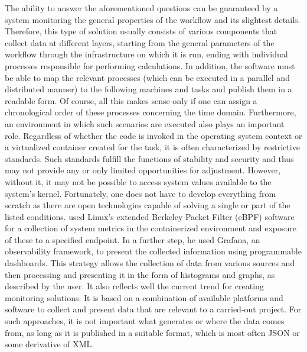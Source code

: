 \documentclass[lettersize,journal]{IEEEtran}
\begin{document}
The ability to answer the aforementioned questions can be guaranteed by a system monitoring the general properties of the workflow and its slightest details. Therefore, this type of solution usually consists of various components that collect data at different layers, starting from the general parameters of the workflow through the infrastructure on which it is run, ending with individual processes responsible for performing calculations. In addition, the software must be able to map the relevant processes (which can be executed in a parallel and distributed manner) to the following machines and tasks and publish them in a readable form. Of course, all this makes sense only if one can assign a chronological order of these processes concerning the time domain. Furthermore, an environment in which such scenarios are executed also plays an important role. Regardless of whether the code is invoked in the operating system context or a virtualized container created for the task, it is often characterized by restrictive standards. Such standards fulfill the functions of stability and security and thus may not provide any or only limited opportunities for adjustment. However, without it, it may not be possible to access system values available to the system's kernel. 
Fortunately, one does not have to develop everything from scratch as there are open technologies capable of solving a single or part of the listed conditions. \citeauthor{levin2020viperproberethinkingmicroservice} used Linux’s extended Berkeley Packet Filter (eBPF)\cite{ebpf} software for a collection of system metrics in the containerized environment and exposure of these to a specified endpoint. In a further step, he used Grafana\cite{grafana}, an observability framework, to present the collected information using programmable dashboards. This strategy allows the collection of data from various sources and then processing and presenting it in the form of histograms and graphs, as described by the user. It also reflects well the current trend for creating monitoring solutions. It is based on a combination of available platforms and software to collect and present data that are relevant to a carried-out project. For such approaches, it is not important what generates or where the data comes from, as long as it is published in a suitable format, which is most often JSON or some derivative of XML.
\end{document}
